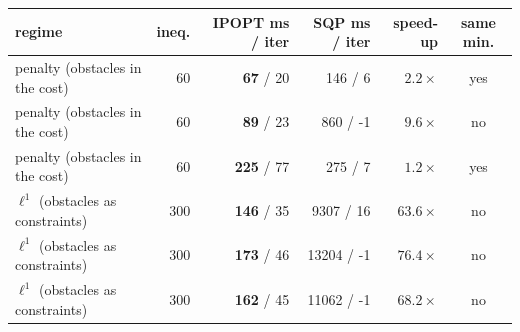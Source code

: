 \begin{tabular}{lrrrrc}
  \toprule
  regime & ineq. & IPOPT ms / iter & SQP ms / iter & speed-up & same min. \\
  \midrule
  penalty (obstacles in the cost) & 60 & \textbf{67} / 20 & 146 / 6 & $2.2\times$ & yes \\
  penalty (obstacles in the cost) & 60 & \textbf{89} / 23 & 860 / -1 & $9.6\times$ & no \\
  penalty (obstacles in the cost) & 60 & \textbf{225} / 77 & 275 / 7 & $1.2\times$ & yes \\
  $\ell^1$ (obstacles as constraints) & 300 & \textbf{146} / 35 & 9307 / 16 & $63.6\times$ & no \\
  $\ell^1$ (obstacles as constraints) & 300 & \textbf{173} / 46 & 13204 / -1 & $76.4\times$ & no \\
  $\ell^1$ (obstacles as constraints) & 300 & \textbf{162} / 45 & 11062 / -1 & $68.2\times$ & no \\
  \bottomrule
\end{tabular}
